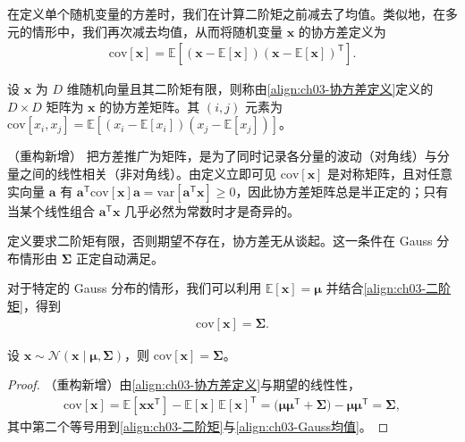 \documentclass[../../main.tex]{subfiles}
\begin{document}
在定义单个随机变量的方差时，我们在计算二阶矩之前减去了均值。类似地，在多元的情形中，我们再次减去均值，从而将随机变量 $\boldsymbol{x}$ 的协方差定义为
\begin{align}
\mathrm{cov}[\boldsymbol{x}]=\mathbb{E}\left[(\boldsymbol{x}-\mathbb{E}[\boldsymbol{x}])(\boldsymbol{x}-\mathbb{E}[\boldsymbol{x}])^{\mathsf{T}}\right].
\label{align:ch03-协方差定义}
\end{align}

\begin{definition}[随机向量的协方差矩阵]\label{definition:ch03-协方差矩阵}
设 $\boldsymbol{x}$ 为 $D$ 维随机向量且其二阶矩有限，则称由\eqref{align:ch03-协方差定义}定义的 $D\times D$ 矩阵为 $\boldsymbol{x}$ 的协方差矩阵。其 $(i,j)$ 元素为 $\mathrm{cov}[x_i,x_j]=\mathbb{E}[(x_i-\mathbb{E}[x_i])(x_j-\mathbb{E}[x_j])]$。
\end{definition}

\begin{remark}（重构新增）
把方差推广为矩阵，是为了同时记录各分量的波动（对角线）与分量之间的线性相关（非对角线）。由定义立即可见 $\mathrm{cov}[\boldsymbol{x}]$ 是对称矩阵，且对任意实向量 $\boldsymbol{a}$ 有 $\boldsymbol{a}^{\mathsf{T}}\mathrm{cov}[\boldsymbol{x}]\boldsymbol{a}=\mathrm{var}[\boldsymbol{a}^{\mathsf{T}}\boldsymbol{x}]\geqslant0$，因此协方差矩阵总是半正定的；只有当某个线性组合 $\boldsymbol{a}^{\mathsf{T}}\boldsymbol{x}$ 几乎必然为常数时才是奇异的。

定义要求二阶矩有限，否则期望不存在，协方差无从谈起。这一条件在 Gauss 分布情形由 $\boldsymbol{\Sigma}$ 正定自动满足。
\end{remark}

对于特定的 Gauss 分布的情形，我们可以利用 $\mathbb{E}[\boldsymbol{x}]=\boldsymbol{\mu}$ 并结合\eqref{align:ch03-二阶矩}，得到
\begin{align}
\mathrm{cov}[\boldsymbol{x}]=\boldsymbol{\Sigma}.
\label{align:ch03-Gauss协方差}
\end{align}

\begin{proposition}\label{proposition:ch03-Gauss协方差}
设 $\boldsymbol{x}\sim\mathcal{N}(\boldsymbol{x}\mid\boldsymbol{\mu},\boldsymbol{\Sigma})$，则 $\mathrm{cov}[\boldsymbol{x}]=\boldsymbol{\Sigma}$。
\end{proposition}
\begin{proof}
（重构新增）由\eqref{align:ch03-协方差定义}与期望的线性性，
\begin{align*}
\mathrm{cov}[\boldsymbol{x}]=\mathbb{E}[\boldsymbol{x}\boldsymbol{x}^{\mathsf{T}}]-\mathbb{E}[\boldsymbol{x}]\,\mathbb{E}[\boldsymbol{x}]^{\mathsf{T}}=\bigl(\boldsymbol{\mu}\boldsymbol{\mu}^{\mathsf{T}}+\boldsymbol{\Sigma}\bigr)-\boldsymbol{\mu}\boldsymbol{\mu}^{\mathsf{T}}=\boldsymbol{\Sigma},
\end{align*}
其中第二个等号用到\eqref{align:ch03-二阶矩}与\eqref{align:ch03-Gauss均值}。
\end{proof}
\end{document}
